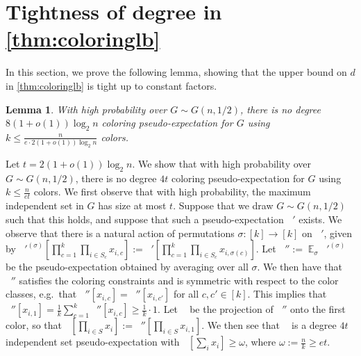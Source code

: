 \documentclass[10pt,a4paper]{article}
\newtheorem{lemma}[theorem]{Lemma}
\theoremstyle{definition}
\newcommand{\Esymb}{\mathbb{E}}
\DeclareMathOperator*{\E}{\Esymb}
\DeclareMathOperator{\pE}{\tilde{\mathbb{E}}}
\newcommand{\numcolors}{k}
\begin{document}
\section{Tightness of degree in \cref{thm:coloringlb}}
\label{sec:independentsetrefutation}
In this section, we prove the following lemma, showing that the upper bound on $d$ in \cref{thm:coloringlb} is tight up to constant factors.
\begin{lemma}
With high probability over $G \sim G(n,1/2)$, there is no degree $8(1 + o(1)) \log_2 n$ coloring pseudo-expectation for $G$ using $\numcolors \leq \frac{n}{e \cdot 2(1 + o(1))\log_2 n}$ colors.
\end{lemma}
Let $t = 2(1 + o(1)) \log_2 n$. We show that with high probability over $G \sim G(n,1/2)$, there is no degree $4t$ coloring pseudo-expectation for $G$ using $\numcolors \leq \frac{n}{e t}$ colors. We first observe that with high probability, the maximum independent set in $G$ has size at most $t$. Suppose that we draw $G \sim G(n,1/2)$ such that this holds, and suppose that such a pseudo-expectation $\pE'$ exists. We observe that there is a natural action of permutations $\sigma \colon [\numcolors] \to [\numcolors]$ on $\pE'$, given by $\pE'^{(\sigma)}[\prod_{c = 1}^\numcolors \prod_{i \in S_c} x_{i,c}] := \pE'[\prod_{c = 1}^\numcolors \prod_{i \in S_c} x_{i, \sigma(c)}]$. Let $\pE'' := \E_{\sigma} \pE'^{(\sigma)}$ be the pseudo-expectation obtained by averaging over all $\sigma$. We then have that $\pE''$ satisfies the coloring constraints and is symmetric with respect to the color classes, e.g.\ that $\pE''[x_{i,c}] = \pE''[x_{i,c'}]$ for all $c,c' \in [\numcolors]$. This implies that $\pE''[x_{i,1}] = \frac{1}{\numcolors} \sum_{c = 1}^\numcolors \pE''[x_{i,c}] \geq \frac{1}{\numcolors} \cdot 1$. Let $\pE$ be the projection of $\pE''$ onto the first color, so that $\pE[\prod_{i \in S} x_i] := \pE''[\prod_{i \in S} x_{i,1}]$. We then see that $\pE$ is a degree $4t$ independent set pseudo-expectation with $\pE[\sum_i x_i] \geq \omega$, where $\omega := \frac{n}{\numcolors} \geq e t$.
\end{document}
